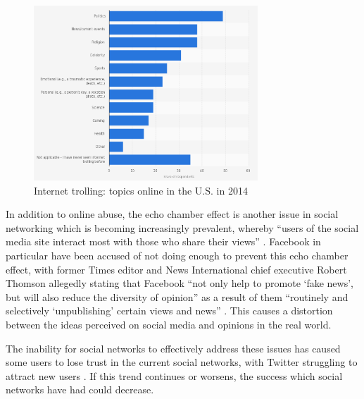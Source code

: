 \begin{figure}[H]
  \centering
  \includegraphics[width=0.75\textwidth]{Images/Introduction/TrollingByTopic}
  \caption{Internet trolling: topics online in the U.S. in 2014 \cite{Statista:TrollingByTopic}} \label{fig:TrollingByTopic} 
\end{figure}

In addition to online abuse, the echo chamber effect is another issue in social networking which is becoming increasingly prevalent, whereby ``users of the social media site interact most with those who share their views'' \cite{Jackson:EchoChamber}. Facebook in particular have been accused of not doing enough to prevent this echo chamber effect, with former Times editor and News International chief executive Robert Thomson allegedly stating that Facebook ``not only help to promote `fake news', but will also reduce the diversity of opinion'' as a result of them ``routinely and selectively `unpublishing' certain views and news'' \cite{Orlowski:EchoChamber}. This causes a distortion between the ideas perceived on social media and opinions in the real world.

The inability for social networks to effectively address these issues has caused some users to lose trust in the current social networks, with Twitter struggling to attract new users \cite{Barrons:Twitter}. If this trend continues or worsens, the success which social networks have had could decrease.

